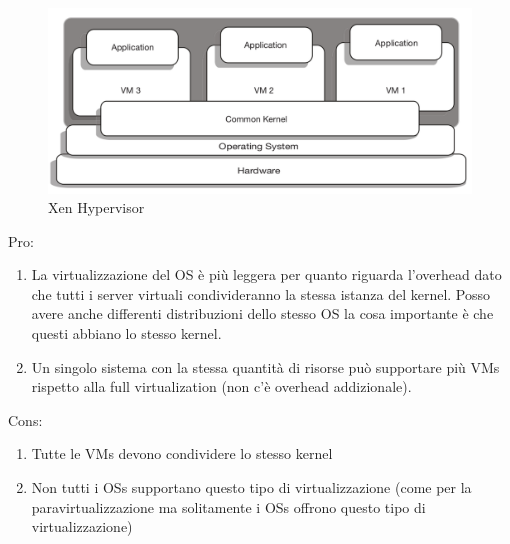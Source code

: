 \documentclass{article}
\begin{document}
\begin{figure}[H]
\centering
\includegraphics[scale=0.5]{img/Virt_tech/20.png}
\caption{Xen Hypervisor}
\end{figure}
Pro:
\begin{enumerate}
    \item La virtualizzazione del OS è più leggera per quanto riguarda l'overhead dato che tutti i server virtuali condivideranno la stessa istanza del kernel. Posso avere anche differenti distribuzioni dello stesso OS la cosa importante è che questi abbiano lo stesso kernel.
    \item Un singolo sistema con la stessa quantità di risorse può supportare più VMs rispetto alla full virtualization (non c'è overhead addizionale).
\end{enumerate}
Cons:
\begin{enumerate}
    \item Tutte le VMs devono condividere lo stesso kernel
    \item Non tutti i OSs supportano questo tipo di virtualizzazione (come per la paravirtualizzazione ma solitamente i OSs offrono questo tipo di virtualizzazione)
\end{enumerate}
\end{document}

